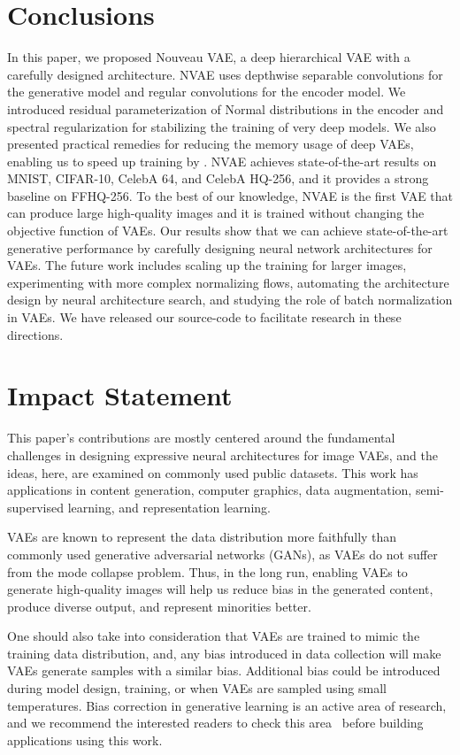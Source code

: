 \documentclass{article}
\begin{document}
 \section{Conclusions}
\vspace{-0.2cm}
In this paper, we proposed Nouveau VAE, a deep hierarchical VAE with a carefully designed architecture. NVAE uses depthwise separable convolutions for the generative model and regular convolutions for the encoder model. We introduced residual parameterization of Normal distributions in the encoder and spectral regularization for stabilizing the training of very deep models. We also presented practical remedies for reducing the memory usage of deep VAEs, enabling us to speed up training by . NVAE achieves state-of-the-art results on MNIST, CIFAR-10, CelebA 64, and CelebA HQ-256, and it provides a strong baseline on FFHQ-256. To the best of our knowledge, NVAE is the first VAE that can produce large high-quality images and it is trained without changing the objective function of VAEs. Our results show that we can achieve state-of-the-art generative performance by carefully designing neural network architectures for VAEs. The future work includes scaling up the training for larger images, experimenting with more complex normalizing flows, automating the architecture design by neural architecture search, and studying the role of batch normalization in VAEs. We have released our source-code to facilitate research in these directions. \section*{Impact Statement}

This paper's contributions are mostly centered around the fundamental challenges in designing expressive neural architectures for image VAEs, and the ideas, here, are examined on commonly used public datasets. This work has applications in content generation, computer graphics, data augmentation, semi-supervised learning, and representation learning.

VAEs are known to represent the data distribution more faithfully than commonly used generative adversarial networks (GANs), as VAEs do not suffer from the mode collapse problem. Thus, in the long run, enabling VAEs to generate high-quality images will help us reduce bias in the generated content, produce diverse output, and represent minorities better.

One should also take into consideration that VAEs are trained to mimic the training data distribution, and, any bias introduced in data collection will make VAEs generate samples with a similar bias. Additional bias could be introduced during model design, training, or when VAEs are sampled using small temperatures. Bias correction in generative learning is an active area of research, and we recommend the interested readers to check this area~\cite{grover2019bias} before building applications using this work.
\end{document}
